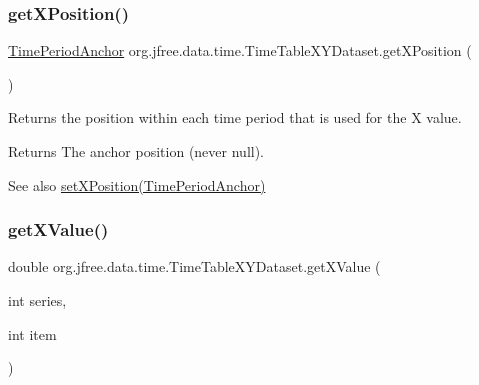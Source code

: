 \mbox{\label{classorg_1_1jfree_1_1data_1_1time_1_1_time_table_x_y_dataset_a8346f001c677400629be5c93775dfeb8}} 
\subsubsection{\texorpdfstring{get\+X\+Position()}{getXPosition()}}
{\footnotesize\ttfamily \mbox{\hyperlink{classorg_1_1jfree_1_1data_1_1time_1_1_time_period_anchor}{Time\+Period\+Anchor}} org.\+jfree.\+data.\+time.\+Time\+Table\+X\+Y\+Dataset.\+get\+X\+Position (\begin{DoxyParamCaption}{ }\end{DoxyParamCaption})}

Returns the position within each time period that is used for the X value.

\begin{DoxyReturn}{Returns}
The anchor position (never {\ttfamily null}).
\end{DoxyReturn}
\begin{DoxySeeAlso}{See also}
\mbox{\hyperlink{classorg_1_1jfree_1_1data_1_1time_1_1_time_table_x_y_dataset_a337c2e5697dc824c58215035b441d338}{set\+X\+Position(\+Time\+Period\+Anchor)}} 
\end{DoxySeeAlso}
\mbox{\label{classorg_1_1jfree_1_1data_1_1time_1_1_time_table_x_y_dataset_a74bc9da96ff2a538f8753d2abc2588b0}} 
\subsubsection{\texorpdfstring{get\+X\+Value()}{getXValue()}}
{\footnotesize\ttfamily double org.\+jfree.\+data.\+time.\+Time\+Table\+X\+Y\+Dataset.\+get\+X\+Value (\begin{DoxyParamCaption}\item[{int}]{series,  }\item[{int}]{item }\end{DoxyParamCaption})}

